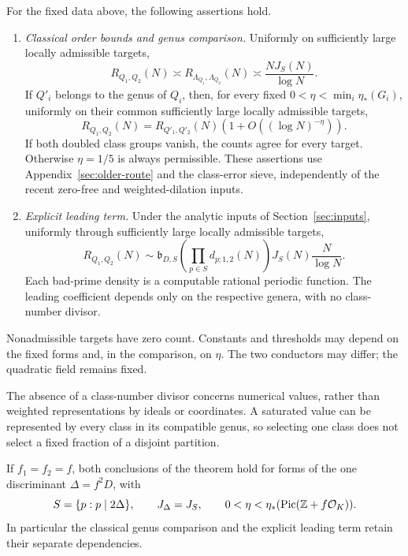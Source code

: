 \begin{theorem}\label{cor:common-field-form-pairs}
For the fixed data above, the following assertions hold.
\begin{enumerate}
\item\label{part:form-classical}
\emph{Classical order bounds and genus comparison.}
Uniformly on sufficiently large locally admissible targets,
\[
 R_{Q_1,Q_2}(N)\asymp R_{\Lambda_{Q_1},\Lambda_{Q_2}}(N)
                              \asymp\frac{NJ_S(N)}{\log N}.
\]
If \(Q'_i\) belongs to the genus of \(Q_i\), then, for every fixed
\(0<\eta<\min_i\eta_*(G_i)\), uniformly on their common sufficiently
large locally admissible targets,
\[
 R_{Q_1,Q_2}(N)=R_{Q'_1,Q'_2}(N)
                         \left(1+O((\log N)^{-\eta})\right).
\]
If both doubled class groups vanish, the counts agree for every target.
Otherwise \(\eta=1/5\) is always permissible. These assertions use
Appendix~\ref{sec:older-route} and the class-error sieve, independently
of the recent zero-free and weighted-dilation inputs.
\item\label{part:form-leading}
\emph{Explicit leading term.}
Under the analytic inputs of Section~\ref{sec:inputs}, uniformly
through sufficiently large locally admissible targets,
\begin{equation}\label{eq:form-binary-leading}
 R_{Q_1,Q_2}(N)\sim
 \mathfrak b_{D,S}\left(\prod_{p\in S}d_{p;1,2}(N)\right)
                              J_S(N)\frac N{\log N}.
\end{equation}
Each bad-prime density is a computable rational periodic function.
The leading coefficient depends only on the respective genera,
with no class-number divisor.
\end{enumerate}
Nonadmissible targets have zero count. Constants and thresholds may
depend on the fixed forms and, in the comparison, on \(\eta\).
The two conductors may differ; the quadratic field remains fixed.
\end{theorem}

The absence of a class-number divisor concerns numerical values,
rather than weighted representations by ideals or coordinates.
A saturated value can be represented by every class in its compatible
genus, so selecting one class does not select a fixed fraction of
a disjoint partition.

\begin{corollary}\label{thm:genus-binary-invariance}\label{thm:form-binary-leading}
If \(f_1=f_2=f\), both conclusions of the theorem hold for forms
of the one discriminant \(\Delta=f^2D\), with
\[
 S=\{p:p\mid2\Delta\},\qquad J_\Delta=J_S,\qquad
 0<\eta<\eta_*(\operatorname{Pic}(\mathbb Z+f\mathcal O_K)).
\]
In particular the classical genus comparison and the explicit leading
term retain their separate dependencies.
\end{corollary}

